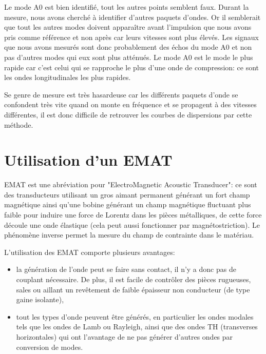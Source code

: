 \documentclass[twoside]{article}
\begin{document}
\begin{multicols}{2}
\bigskip

Le mode A0 est bien identifié, tout les autres points semblent faux. Durant la mesure, nous avons cherché à identifier d'autres paquets d'ondes. Or il semblerait que tout les autres modes doivent apparaître avant l'impulsion que nous avons pris comme référence et non après car leurs vitesses sont plus élevés. Les signaux que nous avons mesurés sont donc probablement des échos du mode A0 et non pas d'autres modes qui eux sont plus atténués.
Le mode A0 est le mode le plus rapide car c'est celui qui se rapproche le plus d'une onde de compression: ce sont les ondes longitudinales les plus rapides.

\bigskip 

Se genre de mesure est très hasardeuse car les différents paquets d'onde se confondent très vite quand on monte en fréquence et se propagent à des vitesses différentes, il est donc difficile de retrouver les courbes de dispersions par cette méthode.



\section{Utilisation d'un EMAT}
EMAT est une abréviation pour "ElectroMagnetic Acoustic Transducer": ce sont des transducteurs utilisant un gros aimant permanent générant un fort champ magnétique ainsi qu'une bobine générant un champ magnétique fluctuant plus faible pour induire une force de Lorentz dans les pièces métalliques, de cette force découle une onde élastique (cela peut aussi fonctionner par magnétostriction). Le phénomène inverse permet la mesure du champ de contrainte dans le matériau.

\bigskip
L'utilisation des EMAT comporte plusieurs avantages:
\begin{itemize}
\item la génération de l'onde peut se faire sans contact, il n'y a donc pas de couplant nécessaire. De plus, il est facile de contrôler des pièces rugueuses, sales ou aillant un revêtement de faible épaisseur non conducteur (de type gaine isolante),
\item tout les types d'onde peuvent être générés, en particulier les ondes modales tels que les ondes de Lamb ou Rayleigh, ainsi que des ondes TH (transverses horizontales) qui ont l'avantage de ne pas générer d'autres ondes par conversion de modes. 
\end{itemize} 


\end{multicols}
\end{document}
